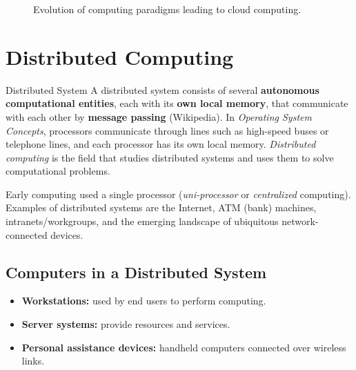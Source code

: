 \begin{figure}[H]
\centering
{}
\caption{Evolution of computing paradigms leading to cloud computing.}
\end{figure}

\section{Distributed Computing}
\begin{defbox}{Distributed System}
A distributed system consists of several \textbf{autonomous computational entities}, each
with its \textbf{own local memory}, that communicate with each other by \textbf{message passing}
(Wikipedia). In \emph{Operating System Concepts}, processors communicate through lines such as
high-speed buses or telephone lines, and each processor has its own local memory.
\emph{Distributed computing} is the field that studies distributed systems and uses them to
solve computational problems.
\end{defbox}

Early computing used a single processor (\emph{uni-processor} or \emph{centralized}
computing). Examples of distributed systems are the Internet, ATM (bank) machines,
intranets/workgroups, and the emerging landscape of ubiquitous network-connected devices.

\subsection{Computers in a Distributed System}
\begin{itemize}[leftmargin=*]
  \item \textbf{Workstations:} used by end users to perform computing.
  \item \textbf{Server systems:} provide resources and services.
  \item \textbf{Personal assistance devices:} handheld computers connected over wireless links.
\end{itemize}

